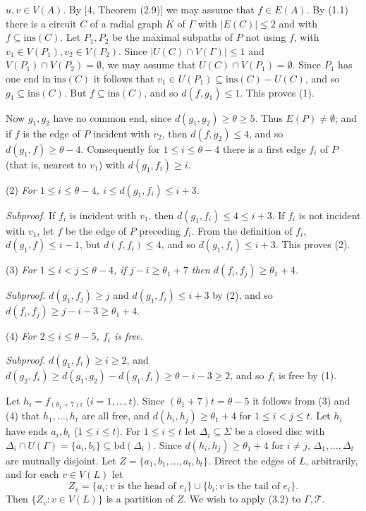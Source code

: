 \noindent $u, v \in V(A)$. By [4, Theorem (2.9)] we may assume that $f \in E(A)$. By (1.1) there is a circuit $C$ of a radial graph $K$ of $\Gamma$ with $|E(C)| \le 2$ and with $f \subseteq \text{ins}(C)$. Let $P_1, P_2$ be the maximal subpaths of $P$ not using $f$, with $v_1 \in V(P_1), v_2 \in V(P_2)$. Since $|U(C) \cap V(\Gamma)| \le 1$ and $V(P_1) \cap V(P_2) = \emptyset$, we may assume that $U(C) \cap V(P_1) = \emptyset$. Since $P_1$ has one end in $\text{ins}(C)$ it follows that $v_1 \in U(P_1) \subseteq \text{ins}(C) - U(C)$, and so $g_1 \subseteq \text{ins}(C)$. But $f \subseteq \text{ins}(C)$, and so $d(f, g_1) \le 1$. This proves (1).

Now $g_1, g_2$ have no common end, since $d(g_1, g_2) \ge \theta \ge 5$. Thus $E(P) \ne \emptyset$; and if $f$ is the edge of $P$ incident with $v_2$, then $d(f, g_2) \le 4$, and so $d(g_1, f) \ge \theta - 4$. Consequently for $1 \le i \le \theta - 4$ there is a first edge $f_i$ of $P$ (that is, nearest to $v_1$) with $d(g_1, f_i) \ge i$.

\hspace*{12pt}(2) \textit{For $1 \le i \le \theta - 4$, $i \le d(g_1, f_i) \le i + 3$.}

\textit{Subproof.} If $f_i$ is incident with $v_1$, then $d(g_1, f_i) \le 4 \le i + 3$. If $f_i$ is not incident with $v_1$, let $f$ be the edge of $P$ preceding $f_i$. From the definition of $f_i$, $d(g_1, f) \le i - 1$, but $d(f, f_i) \le 4$, and so $d(g_1, f_i) \le i + 3$. This proves (2).

\hspace*{12pt}(3) \textit{For $1 \le i < j \le \theta - 4$, if $j - i \ge \theta_1 + 7$ then $d(f_i, f_j) \ge \theta_1 + 4$.}

\textit{Subproof.} $d(g_1, f_j) \ge j$ and $d(g_1, f_i) \le i + 3$ by (2), and so $d(f_i, f_j) \ge j - i - 3 \ge \theta_1 + 4$.

\hspace*{12pt}(4) \textit{For $2 \le i \le \theta - 5$, $f_i$ is free.}

\textit{Subproof.} $d(g_1, f_i) \ge i \ge 2$, and $d(g_2, f_i) \ge d(g_1, g_2) - d(g_1, f_i) \ge \theta - i - 3 \ge 2$, and so $f_i$ is free by (1).

Let $h_i = f_{(\theta_1 + 7)i}$ ($i = 1, \dots, t$). Since $(\theta_1 + 7)t = \theta - 5$ it follows from (3) and (4) that $h_1, \dots, h_t$ are all free, and $d(h_i, h_j) \ge \theta_1 + 4$ for $1 \le i < j \le t$. Let $h_i$ have ends $a_i, b_i$ ($1 \le i \le t$). For $1 \le i \le t$ let $\Delta_i \subseteq \Sigma$ be a closed disc with $\Delta_i \cap U(\Gamma) = \{a_i, b_i\} \subseteq \text{bd}(\Delta_i)$. Since $d(h_i, h_j) \ge \theta_1 + 4$ for $i \ne j$, $\Delta_1, \dots, \Delta_t$ are mutually disjoint. Let $Z = \{a_1, b_1, \dots, a_t, b_t\}$. Direct the edges of $L$, arbitrarily, and for each $v \in V(L)$ let
\begin{equation*}
Z_v = \{a_i; v \text{ is the head of } e_i\} \cup \{b_i; v \text{ is the tail of } e_i\}.
\end{equation*}
Then $\{Z_v \colon v \in V(L)\}$ is a partition of $Z$. We wish to apply (3.2) to $\Gamma, \mathscr{T}$.

